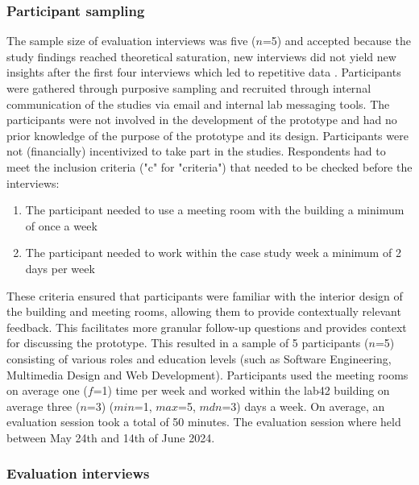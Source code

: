 \subsubsection{Participant sampling}

The sample size of evaluation interviews was five ($n$=5) and accepted because the study findings reached theoretical saturation, new interviews did not yield new insights after the first four interviews which led to repetitive data \cite{steph_menken_introduction_2016}. Participants were gathered through purposive sampling and recruited through internal communication of the studies via email and internal lab messaging tools. The participants were not involved in the development of the prototype and had no prior knowledge of the purpose of the prototype and its design. Participants were not (financially) incentivized to take part in the studies. Respondents had to meet the inclusion criteria ("c" for "criteria") that needed to be checked before the interviews: 

\begin{enumerate}
    \renewcommand{\labelenumi}{C\arabic{enumi}:}
    \item The participant needed to use a meeting room with the building a minimum of once a week
    \item The participant needed to work within the case study week a minimum of 2 days per week
\end{enumerate}

These criteria ensured that participants were familiar with the interior design of the building and meeting rooms, allowing them to provide contextually relevant feedback. This facilitates more granular follow-up questions and provides context for discussing the prototype. This resulted in a sample of 5 participants ($n$=5) consisting of various roles and education levels (such as Software Engineering, Multimedia Design and Web Development). Participants used the meeting rooms on average one ($f$=1) time per week and worked within the lab42 building on average three ($n$=3) ($min$=1, $max$=5, $mdn$=3) days a week. On average, an evaluation session took a total of 50 minutes. The evaluation session where held between May 24th and 14th of June 2024. 

\subsubsection{Evaluation interviews}

